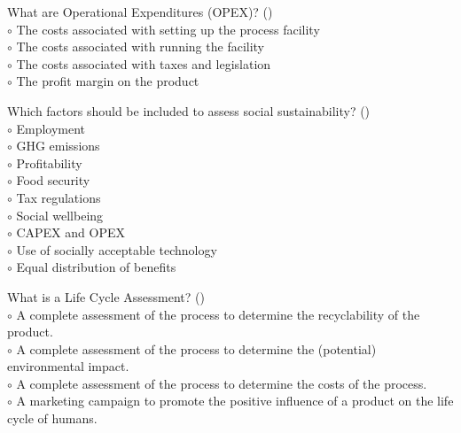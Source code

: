 \documentclass[]{beamer}
\begin{document}
\begin{CJK}{UTF8}{gbsn}
\begin{frame}[shrink] {} 
\addtocounter{questions}{1}
\color{blue}
  What are Operational Expenditures (OPEX)?
 ({})\\
\color{black}
\setlength{\parindent}{-0.4cm}
{\color{red}$\circ$} The costs associated with setting up the process facility  \\
{\color{red}$\circ$}  The costs associated with running the facility  \\
{\color{red}$\circ$} The costs associated with taxes and legislation  \\
{\color{red}$\circ$} The profit margin on the product  \\
\end{frame}


\begin{frame}[shrink] {} 
\addtocounter{questions}{1}
\color{blue}
  Which factors should be included to assess social sustainability? 
 ({})\\
\color{black}
\setlength{\parindent}{-0.4cm}
{\color{red}$\circ$}  Employment  \\
{\color{red}$\circ$} GHG emissions  \\
{\color{red}$\circ$} Profitability  \\
{\color{red}$\circ$}  Food security  \\
{\color{red}$\circ$} Tax regulations  \\
{\color{red}$\circ$}  Social wellbeing  \\
{\color{red}$\circ$} CAPEX and OPEX  \\
{\color{red}$\circ$}  Use of socially acceptable technology  \\
{\color{red}$\circ$}  Equal distribution of benefits  \\
\end{frame}


\begin{frame}[shrink] {} 
\addtocounter{questions}{1}
\color{blue}
  What is a Life Cycle Assessment?
 ({})\\
\color{black}
\setlength{\parindent}{-0.4cm}
{\color{red}$\circ$} A complete assessment of the process to determine the recyclability of the product.  \\
{\color{red}$\circ$}  A complete assessment of the process to determine the (potential) environmental impact.  \\
{\color{red}$\circ$} A complete assessment of the process to determine the costs of the process.  \\
{\color{red}$\circ$} A marketing campaign to promote the positive influence of a product on the life cycle of humans.  \\


\end{frame}
\end{CJK}
\end{document}
